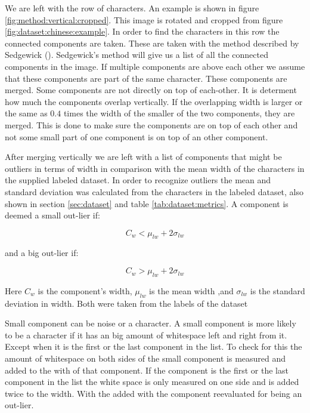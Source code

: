 We are left with the row of characters. An example is shown in figure \ref{fig:method:vertical:cropped}. This image is rotated and cropped from figure \ref{fig:dataset:chinese:example}. In order to find the characters in this row the connected components are taken. These are taken with the method described by Sedgewick (\cite{Sedgewick}). Sedgewick's method will give us a list of all the connected components in the image. If multiple components are above each other we assume that these components are part of the same character. These components are merged. Some components are not directly on top of each-other. It is determent how much the components overlap vertically. If the overlapping width is larger or the same as $0.4$ times the width of the smaller of the two components, they are merged. This is done to make sure the components are on top of each other and not some small part of one component is on top of an other component.

After merging vertically we are left with a list of components that might be outliers in terms of width in comparison with the mean width of the characters in the supplied labeled dataset. In order to recognize outliers the mean and standard deviation was calculated from the characters in the labeled dataset, also shown in section \ref{sec:dataset} and table \ref{tab:dataset:metrics}. A component is deemed a small out-lier if:

\begin{equation}
C_w < \mu_{lw} + 2 \sigma_{lw} 
\end{equation}

\noindent and a big out-lier if:

\begin{equation}
C_w > \mu_{lw} + 2 \sigma_{lw} 
\end{equation}

Here $C_w$ is the component's width, $\mu_{lw}$ is the mean width ,and $\sigma_{lw}$ is the standard deviation in width. Both were taken from the labels of the dataset

Small component can be noise or a character. A small component is more likely to be a character if it has an big amount of whitespace left and right from it. Except when it is the first or the last component in the list. To check for this the amount of whitespace on both sides of the small component is measured and added to the with of that component. If the component is the first or the last component in the list the white space is only measured on one side and is added twice to the width. With the added with the component reevaluated for being an out-lier.

